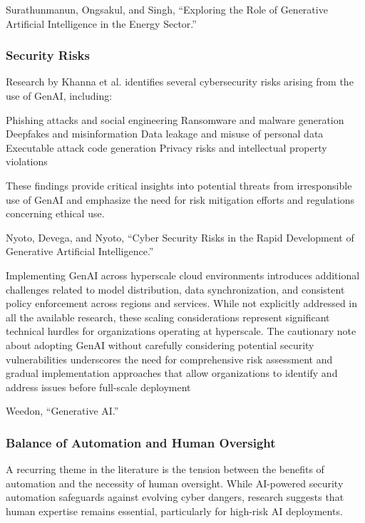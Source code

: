 Surathunmanun, Ongsakul, and Singh, “Exploring the Role of Generative Artificial Intelligence in the Energy Sector.”


\subsubsection{Security Risks} %
\label{sec:Security Risks}

Research by Khanna et al. identifies several cybersecurity risks arising from the use of GenAI, including:

Phishing attacks and social engineering
Ransomware and malware generation
Deepfakes and misinformation
Data leakage and misuse of personal data
Executable attack code generation
Privacy risks and intellectual property violations

These findings provide critical insights into potential threats from irresponsible use of GenAI and emphasize the need for risk mitigation efforts and regulations concerning ethical use.

Nyoto, Devega, and Nyoto, “Cyber Security Risks in the Rapid Development of Generative Artificial Intelligence.”

Implementing GenAI across hyperscale cloud environments introduces additional challenges related to model distribution, data synchronization, and consistent policy enforcement across regions and services. While not explicitly addressed in all the available research, these scaling considerations represent significant technical hurdles for organizations operating at hyperscale.
The cautionary note about adopting GenAI without carefully considering potential security vulnerabilities underscores the need for comprehensive risk assessment and gradual implementation approaches that allow organizations to identify and address issues before full-scale deployment

Weedon, “Generative AI.”


\subsubsection{Balance of Automation and Human Oversight} %
\label{sec:Balance of Automation and Human Oversight}

A recurring theme in the literature is the tension between the benefits of automation and the necessity of human oversight. While AI-powered security automation safeguards against evolving cyber dangers, research suggests that human expertise remains essential, particularly for high-risk AI deployments.


